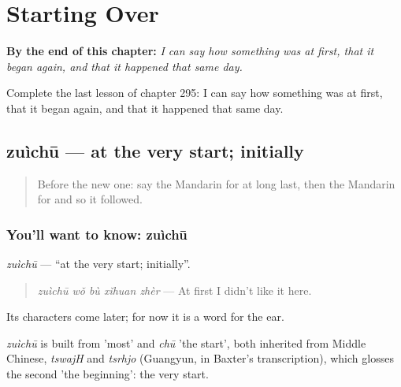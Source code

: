 
\chapter{Starting Over}
\label{ch:zh-starting-over}

\begin{chapteropening}
\textbf{By the end of this chapter:} \emph{I can say how something was at first, that it began again, and that it happened that same day.}

Complete the last lesson of chapter 295: I can say how something was at first, that it began again, and that it happened that same day.
\end{chapteropening}

\section[zuìchū]{zuìchū — at the very start; initially}

\label{lesson:ZH-C295-zuichu}



\begin{quote}
Before the new one: say the Mandarin for at long last, then the Mandarin for and so it followed.
\end{quote}

\subsection*{You'll want to know: zuìchū}
\emph{zuìchū} — \textquotedblleft{}at the very start; initially\textquotedblright{}.

\begin{quote}
\emph{zuìchū wǒ bù xǐhuan zhèr} — At first I didn't like it here.
\end{quote}

Its characters come later; for now it is a word for the ear.

\begin{cousinweb}
\emph{zuìchū} is built from  'most' and \emph{chū} 'the start', both inherited from Middle Chinese, \emph{tswajH} and \emph{tsrhjo} (Guangyun, in Baxter's transcription), which glosses the second 'the beginning': the very start.
\end{cousinweb}

